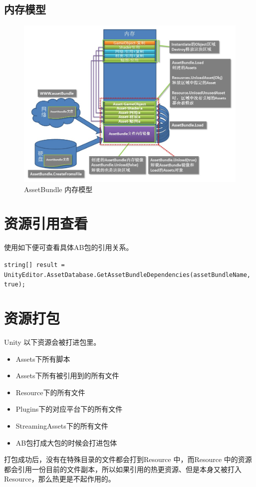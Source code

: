 \documentclass[UTF8,a4paper,12pt]{ctexbook}
\begin{document}
		\subsection{内存模型}
			\begin{figure}[H]
				\centering
				\includegraphics[scale=0.7]{assetBundel}
				\caption{AssetBundle 内存模型}
		\end{figure}
	
	\section{资源引用查看}
		使用如下便可查看具体AB包的引用关系。
	
		\verb|string[] result = UnityEditor.AssetDatabase.GetAssetBundleDependencies(assetBundleName, true);|
	
		
	\section{资源打包}
		Unity  以下资源会被打进包里。
		\begin{itemize}
			\item Assets下所有脚本
			\item Assets下所有被引用到的所有文件
			\item Resource下的所有文件
			\item Plugins下的对应平台下的所有文件
			\item StreamingAssets下的所有文件
			\item AB包打成大包的时候会打进包体
		\end{itemize}
	
	
		打包成功后，没有在特殊目录的文件都会打到Resource 中，而Resource 中的资源都会引用一份目前的文件副本，所以如果引用的热更资源、但是本身又被打入Resource，那么热更是不起作用的。
		
\end{document}
